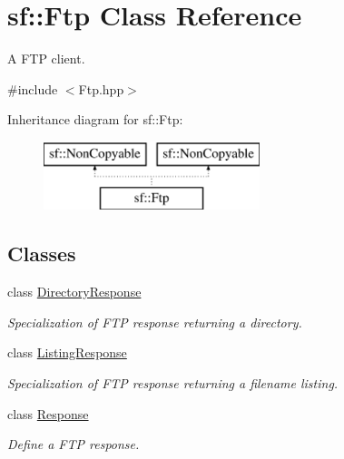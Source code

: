 \hypertarget{classsf_1_1_ftp}{\section{sf\-:\-:Ftp Class Reference}
\label{classsf_1_1_ftp}
}


A F\-T\-P client.  




{\ttfamily \#include $<$Ftp.\-hpp$>$}

Inheritance diagram for sf\-:\-:Ftp\-:\begin{figure}[H]
\begin{center}
\leavevmode
\includegraphics[height=2.000000cm]{classsf_1_1_ftp}
\end{center}
\end{figure}
\subsection*{Classes}
\begin{DoxyCompactItemize}
\item 
class \hyperlink{classsf_1_1_ftp_1_1_directory_response}{Directory\-Response}
\begin{DoxyCompactList}\small\item\em Specialization of F\-T\-P response returning a directory. \end{DoxyCompactList}\item 
class \hyperlink{classsf_1_1_ftp_1_1_listing_response}{Listing\-Response}
\begin{DoxyCompactList}\small\item\em Specialization of F\-T\-P response returning a filename listing. \end{DoxyCompactList}\item 
class \hyperlink{classsf_1_1_ftp_1_1_response}{Response}
\begin{DoxyCompactList}\small\item\em Define a F\-T\-P response. \end{DoxyCompactList}\end{DoxyCompactItemize}
